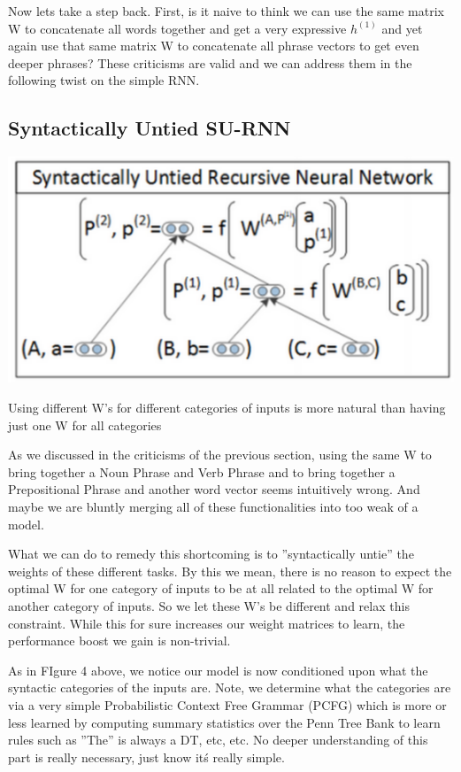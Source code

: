 \documentclass{tufte-handout}
\begin{document}
Now lets take a step back. First, is it naive to think we can use the same matrix W to concatenate all words together and get a very expressive $h^{(1)}$ and yet again use that same matrix W to concatenate all phrase vectors to get even deeper phrases? These criticisms are valid and we can address them in the following twist on the simple RNN.

\subsection{Syntactically Untied SU-RNN}


\begin{marginfigure}%
  \includegraphics[width=\linewidth]{img4}
  \caption{Using different W's for different categories of inputs is more natural than having just one W for all categories }
  \label{fig:img4}
\end{marginfigure}

As we discussed in the criticisms of the previous section, using the same W to bring together a Noun Phrase and Verb Phrase and to bring together a Prepositional Phrase and another word vector seems intuitively wrong. And maybe we are bluntly merging all of these functionalities into too weak of a model. 

What we can do to remedy this shortcoming is to ''syntactically untie'' the weights of these different tasks. By this we mean, there is no reason to expect the optimal W for one category of inputs to be at all related to the optimal W for another category of inputs. So we let these W's be different and relax this constraint. While this for sure increases our weight matrices to learn, the performance boost we gain is non-trivial. 

As in FIgure 4 above, we notice our model is now conditioned upon what the syntactic categories of the inputs are. Note, we determine what the categories are via a very simple Probabilistic Context Free Grammar (PCFG) which is more or less learned by computing summary statistics over the Penn Tree Bank to learn rules such as ''The'' is always a DT, etc, etc. No deeper understanding of this part is really necessary, just know it\'s really simple. 
\end{document}
